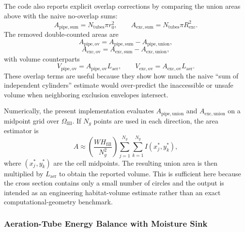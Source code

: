 \documentclass{article}
\begin{document}
The code also reports explicit overlap corrections by comparing the union
areas above with the naive no-overlap sums:
\begin{equation}
A_{\mathrm{pipe,sum}} = N_{\mathrm{tubes}} \pi r_0^2,
\qquad
A_{\mathrm{exc,sum}} = N_{\mathrm{tubes}} \pi R_{\mathrm{exc}}^2.
\end{equation}
The removed double-counted areas are
\begin{equation}
A_{\mathrm{pipe,ov}} = A_{\mathrm{pipe,sum}} - A_{\mathrm{pipe,union}},
\end{equation}
\begin{equation}
A_{\mathrm{exc,ov}} = A_{\mathrm{exc,sum}} - A_{\mathrm{exc,union}},
\end{equation}
with volume counterparts
\begin{equation}
V_{\mathrm{pipe,ov}} = A_{\mathrm{pipe,ov}} L_{\mathrm{aer}},
\qquad
V_{\mathrm{exc,ov}} = A_{\mathrm{exc,ov}} L_{\mathrm{aer}}.
\end{equation}
These overlap terms are useful because they show how much the naive
``sum of independent cylinders'' estimate would over-predict the inaccessible or unsafe
volume when neighboring exclusion envelopes intersect.

Numerically, the present implementation evaluates
$A_{\mathrm{pipe,union}}$ and $A_{\mathrm{exc,union}}$ on a midpoint grid
over $\Omega_{\mathrm{fill}}$. If $N_g$ points are used in each direction,
the area estimator is
\begin{equation}
A \approx \left(\frac{W H_{\mathrm{fill}}}{N_g^2}\right)
\sum_{j=1}^{N_g} \sum_{k=1}^{N_g} I(x_j^\ast,y_k^\ast),
\end{equation}
where $(x_j^\ast,y_k^\ast)$ are the cell midpoints. The resulting union area
is then multiplied by $L_{\mathrm{aer}}$ to obtain the reported volume.
This is sufficient here because the cross section contains only a small
number of circles and the output is intended as an engineering habitat-volume
estimate rather than an exact computational-geometry benchmark.

\subsubsection{Aeration-Tube Energy Balance with Moisture Sink}
\end{document}
